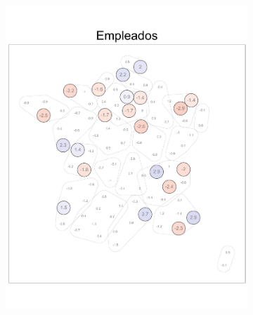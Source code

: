 \begin{figure}
\begin{subfigure}{0.235\textwidth}
	\includegraphics[width = \textwidth]{Figs/Efectos/Dorling_Efectos_CSP5_Modelo_H}
	\end{subfigure}
	~
	\begin{subfigure}{0.235\textwidth}

\end{subfigure}
\end{figure}
